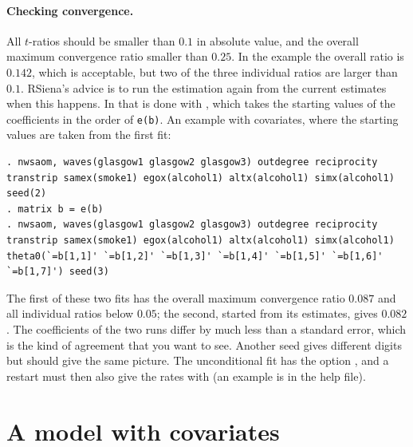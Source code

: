 \paragraph{Checking convergence.} All $t$-ratios should be smaller than $0.1$ in absolute value, and the overall maximum convergence ratio smaller than $0.25$. In the example the overall ratio is $0.142$, which is acceptable, but two of the three individual ratios are larger than $0.1$. RSiena's advice is to run the estimation again from the current estimates when this happens. In \nwsaom{} that is done with , which takes the starting values of the coefficients in the order of \texttt{e(b)}. An example with covariates, where the starting values are taken from the first fit:
\begin{lstlisting}
. nwsaom, waves(glasgow1 glasgow2 glasgow3) outdegree reciprocity transtrip samex(smoke1) egox(alcohol1) altx(alcohol1) simx(alcohol1) seed(2)
. matrix b = e(b)
. nwsaom, waves(glasgow1 glasgow2 glasgow3) outdegree reciprocity transtrip samex(smoke1) egox(alcohol1) altx(alcohol1) simx(alcohol1) theta0(`=b[1,1]' `=b[1,2]' `=b[1,3]' `=b[1,4]' `=b[1,5]' `=b[1,6]' `=b[1,7]') seed(3)
\end{lstlisting}
The first of these two fits has the overall maximum convergence ratio $0.087$ and all individual ratios below $0.05$; the second, started from its estimates, gives $0.082$. The coefficients of the two runs differ by much less than a standard error, which is the kind of agreement that you want to see. Another seed gives different digits but should give the same picture. The unconditional fit has the option , and a restart must then also give the rates with  (an example is in the help file).

\section{A model with covariates}

